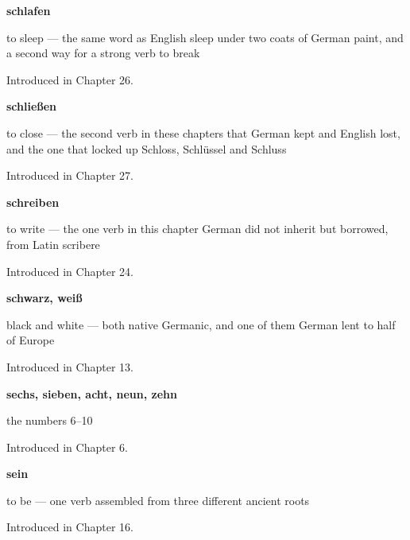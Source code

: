 \noindent\begin{minipage}[t]{\linewidth}
\raggedright
\textbf{schlafen}\par
\small to sleep — the same word as English sleep under two coats of German paint, and a second way for a strong verb to break\par
\footnotesize Introduced in Chapter 26.
\end{minipage}\par\medskip

\noindent\begin{minipage}[t]{\linewidth}
\raggedright
\textbf{schließen}\par
\small to close — the second verb in these chapters that German kept and English lost, and the one that locked up Schloss, Schlüssel and Schluss\par
\footnotesize Introduced in Chapter 27.
\end{minipage}\par\medskip

\noindent\begin{minipage}[t]{\linewidth}
\raggedright
\textbf{schreiben}\par
\small to write — the one verb in this chapter German did not inherit but borrowed, from Latin scribere\par
\footnotesize Introduced in Chapter 24.
\end{minipage}\par\medskip

\noindent\begin{minipage}[t]{\linewidth}
\raggedright
\textbf{schwarz, weiß}\par
\small black and white — both native Germanic, and one of them German lent to half of Europe\par
\footnotesize Introduced in Chapter 13.
\end{minipage}\par\medskip

\noindent\begin{minipage}[t]{\linewidth}
\raggedright
\textbf{sechs, sieben, acht, neun, zehn}\par
\small the numbers 6–10\par
\footnotesize Introduced in Chapter 6.
\end{minipage}\par\medskip

\noindent\begin{minipage}[t]{\linewidth}
\raggedright
\textbf{sein}\par
\small to be — one verb assembled from three different ancient roots\par
\footnotesize Introduced in Chapter 16.
\end{minipage}\par\medskip

